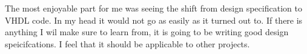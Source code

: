 The most enjoyable part for me was seeing the shift from design specification to VHDL code. In my head it would not go as easily as it turned out to. If there is anything I wil make sure to learn from, it is going to be writing good design speicifcations. I feel that it should be applicable to other projects.